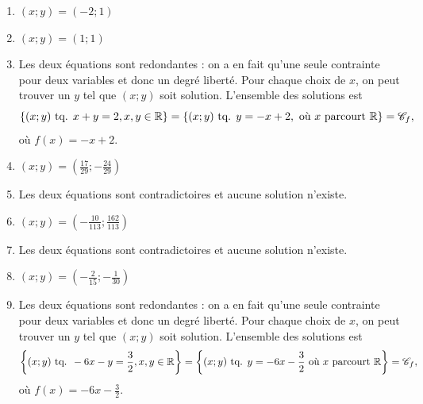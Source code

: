 {	\begin{enumerate}[label=\roman*), itemsep=20pt]
		\item $(x ; y) = (-2 ; 1)$
		\item $(x ; y) = (1;1)$
		\item Les deux équations sont redondantes : on a en fait qu'une seule contrainte pour deux variables et donc un degré liberté. Pour chaque choix de $x$, on peut trouver un $y$ tel que $(x;y)$ soit solution.
		L'ensemble des solutions est
			\[ \{ (x ; y) \text{ tq. } x+y=2, x, y \in \mathbb{R} \} = \{ (x ; y) \text{ tq. } y = -x + 2, \text{ où $x$ parcourt $\mathbb{R}$} \} = \mathcal{C}_f, \]
		où $f(x) = -x+2$.
		\item $(x ; y) = \left(\frac{17}{29} ; -\frac{24}{29}\right)$
		\item Les deux équations sont contradictoires et aucune solution n'existe.
		\item $(x ; y) = \left(-\frac{10}{113} ; \frac{162}{113}\right)$
		\item Les deux équations sont contradictoires et aucune solution n'existe.
		\item $(x ; y) = \left(-\frac{2}{15} ; -\frac{1}{30}\right)$
		\item Les deux équations sont redondantes : on a en fait qu'une seule contrainte pour deux variables et donc un degré liberté. Pour chaque choix de $x$, on peut trouver un $y$ tel que $(x;y)$ soit solution.
		L'ensemble des solutions est
			\[ \left\{ (x ; y) \text{ tq. } -6x -y = \frac32, x, y \in \mathbb{R} \right\} = \left\{ (x ; y) \text{ tq. } y= -6x - \frac32 \text{ où $x$ parcourt $\mathbb{R}$} \right\} = \mathcal{C}_f, \]
		où $f(x) =-6x - \frac32$.
	\end{enumerate}
}






